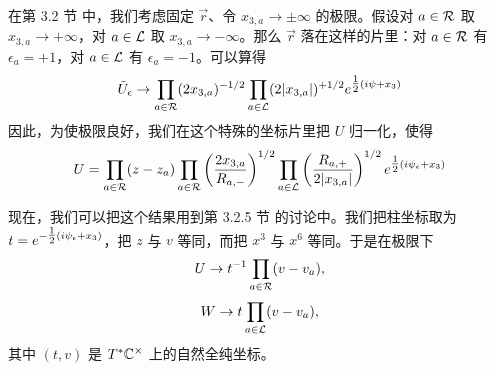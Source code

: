 在第 3.2 节%
中，我们考虑固定 $\vec r$、令 $x_{3,a} \to \pm \infty$ 的极限。假设对 $a \in \mathcal{R}$ 取 $x_{3,a} \to +\infty$，对 $a \in \mathcal{L}$ 取 $x_{3,a} \to -\infty$。那么 $\vec r$ 落在这样的片里：对 $a \in \mathcal{R}$ 有 $\epsilon_a = +1$，对 $a\in \mathcal{L}$ 有 $\epsilon_a = -1$。可以算得
\begin{equation}
\tilde U_\epsilon \to \prod_{a\in \mathcal{R}} (2 x_{3,a})^{-1/2}
\prod_{a\in \mathcal{L}} (2 \vert x_{3,a}\vert)^{+1/2} e^{\tfrac{1}{2} (i \psi +x_3)}
\end{equation}
因此，为使极限良好，我们在这个特殊的坐标片里把 $U$ 归一化，使得
\begin{equation}
U = \prod_{a\in \mathcal{R}} (z-z_a) \prod_{a\in \mathcal{R}} \left(
\frac{2x_{3,a}}{R_{a,-}} \right)^{1/2} \prod_{a \in \mathcal{L}}
\left(\frac{ R_{a,+}}{2\vert x_{3,a}\vert}\right)^{1/2} e^{\tfrac{1}{2} (i \psi_\epsilon + x_3)}
\end{equation}

现在，我们可以把这个结果用到第 3.2.5 节%
的讨论中。我们把柱坐标取为 $t = e^{-\tfrac{1}{2} (i \psi_\epsilon + x_3)}$，把 $z$ 与 $v$ 等同，而把 $x^3$ 与 $x^6$ 等同。于是在极限下
\begin{equation}
U \to t^{-1} \prod_{a\in \mathcal{R}} (v-v_a),
\end{equation}
\begin{equation}
W \to t \prod_{a\in \mathcal{L}} (v-v_a),
\end{equation}
其中 $(t, v)$ 是 $T^*\mathbb{C}^\times$ 上的自然全纯坐标。

